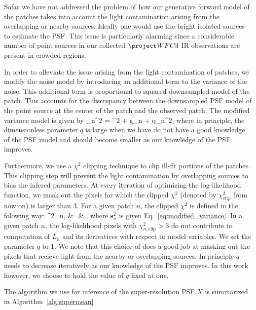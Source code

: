 Sofar we have not addressed the problem of how our generative forward model of the patches takes into account the light contamination arising from 
the overlapping or nearby sources. Ideally one would use the bright isolated sources to estimate the PSF. This issue is particularly alarming since 
a considerable number of point sources in our collected $\wfc$ IR observations are present in crowded regions. 

In order to alleviate the issue arising from the light contamination of patches, we modify the noise model by introducing an additional term to the variance 
of the noise. This additional term is proportional to squared downsampled model of the patch. This accounts for the discrepancy between the downsampled PSF model of the 
point source at the center of the patch and the observed patch. The modified variance model is given by
\beq
{}_n^2 = \sigma^{2} + g_{n} + q_{n}^{2},
\label{eq:modified_variance}
\eeq 
where in principle, the dimensionless parameter $q$ is large when we have do not have a good knowledge of the PSF model and should become 
smaller as our knowledge of the PSF improves. 

Furthermore, we use a $\chi^2$ clipping technique to clip ill-fit portions of the patches. 
This clipping step will prevent the light contamination by overlapping sources to bias the infered parameters. 
At every iteration of optimizing the log-likelihood function, we mask out the pixels for which the clipped $\chi^{2}$ 
(denoted by $\chi^{2}_{clip}$ from now on) is larger than 3. For a given patch $n$, the clipped $\chi^{2}$ is defined in the folowing way:
\beq
\chi^{2}_{n,} &=& , 
\eeq
where $\mathbf{s}_{n}^{2}$ is given Eq.~\ref{eq:modified_variance}. In a given patch $n$, the log-likelihood pixels with $\chi^{2}_{n,\mathrm{clip}} > 3$ 
do not contribute to computation of $L_n$ and its derivatives with respect to model variables. 
We set the parameter $q$ to 1. We note that this choice of does a good job at masking out the pixels that recieve light from the nearby or overlapping sources. 
In principle $q$ needs to decrease iteratively as our knowledge of the PSF improves. In this work however, we choose to hold the value of $q$ fixed at one. 

The algorithm we use for inference of the super-resolution PSF $X$ is summarized in Algorithm~\ref{alg:supermean}


